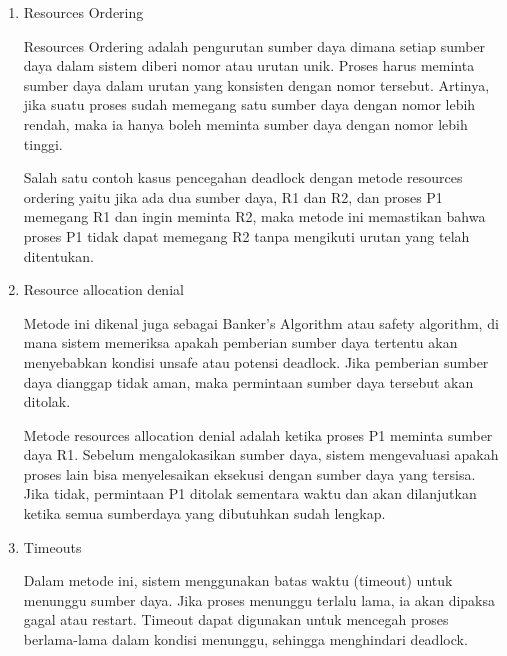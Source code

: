\documentclass[12pt]{article}
\begin{document}
\begin{enumerate}
    \item Resources Ordering

          \hspace{1cm}Resources Ordering adalah pengurutan sumber daya dimana setiap sumber daya
          dalam sistem diberi nomor atau urutan unik. Proses harus meminta sumber daya
          dalam urutan yang konsisten dengan nomor tersebut. Artinya, jika suatu proses
          sudah memegang satu sumber daya dengan nomor lebih rendah, maka ia hanya boleh
          meminta sumber daya dengan nomor lebih tinggi.

          \hspace{1cm}Salah satu contoh kasus pencegahan deadlock dengan metode resources
          ordering yaitu jika ada dua sumber daya, R1 dan R2, dan proses P1 memegang R1 dan ingin
          meminta R2, maka metode ini memastikan bahwa proses P1 tidak dapat memegang R2
          tanpa mengikuti urutan yang telah ditentukan.

    \item Resource allocation denial

          \hspace{1cm}Metode ini dikenal juga sebagai Banker's
          Algorithm atau safety algorithm, di mana sistem memeriksa apakah pemberian
          sumber daya tertentu akan menyebabkan kondisi unsafe atau potensi deadlock.
          Jika pemberian sumber daya dianggap tidak aman, maka permintaan sumber daya
          tersebut akan ditolak.

          \hspace{1cm}Metode resources allocation denial adalah ketika
          proses P1 meminta sumber daya R1. Sebelum mengalokasikan sumber daya, sistem mengevaluasi
          apakah proses lain bisa menyelesaikan eksekusi dengan sumber daya yang tersisa.
          Jika tidak, permintaan P1 ditolak sementara waktu dan akan dilanjutkan ketika semua sumberdaya yang dibutuhkan sudah lengkap.

    \item Timeouts

          \hspace{1cm}Dalam metode ini, sistem menggunakan batas waktu (timeout)
          untuk menunggu sumber daya. Jika proses menunggu terlalu lama, ia akan dipaksa
          gagal atau restart. Timeout dapat digunakan untuk mencegah proses berlama-lama
          dalam kondisi menunggu, sehingga menghindari deadlock.


\end{enumerate}
\end{document}
